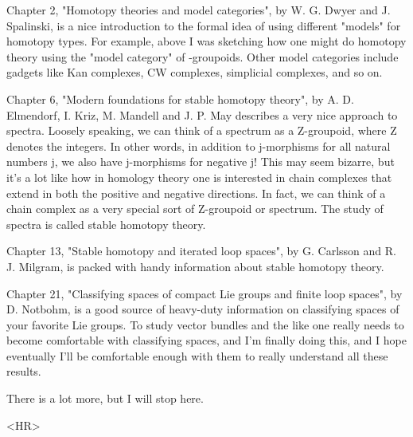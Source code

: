 Chapter 2, "Homotopy theories and model categories", by W. G. Dwyer
and J. Spalinski, is a nice introduction to the formal idea of using
different "models" for homotopy types.  For example, above I was
sketching how one might do homotopy theory using the "model category"
of \omega -groupoids.  Other model categories include gadgets like Kan
complexes, CW complexes, simplicial complexes, and so on.  

Chapter 6, "Modern foundations for stable homotopy theory", by
A. D. Elmendorf, I. Kriz, M. Mandell and J. P. May describes a very
nice approach to spectra.  Loosely speaking, we can think of a
spectrum as a Z-groupoid, where Z denotes the integers.  In other
words, in addition to j-morphisms for all natural numbers j, we also
have j-morphisms for negative j!  This may seem bizarre, but it's a
lot like how in homology theory one is interested in chain complexes
that extend in both the positive and negative directions.  In fact,
we can think of a chain complex as a very special sort of Z-groupoid
or spectrum.  The study of spectra is called stable homotopy theory.

Chapter 13, "Stable homotopy and iterated loop spaces", by G. Carlsson
and R. J. Milgram, is packed with handy information about stable
homotopy theory.

Chapter 21, "Classifying spaces of compact Lie groups and finite loop
spaces", by D. Notbohm, is a good source of heavy-duty information on
classifying spaces of your favorite Lie groups.  To study vector
bundles and the like one really needs to become comfortable with
classifying spaces, and I'm finally doing this, and I hope eventually
I'll be comfortable enough with them to really understand all these
results.

There is a lot more, but I will stop here.

<HR>



